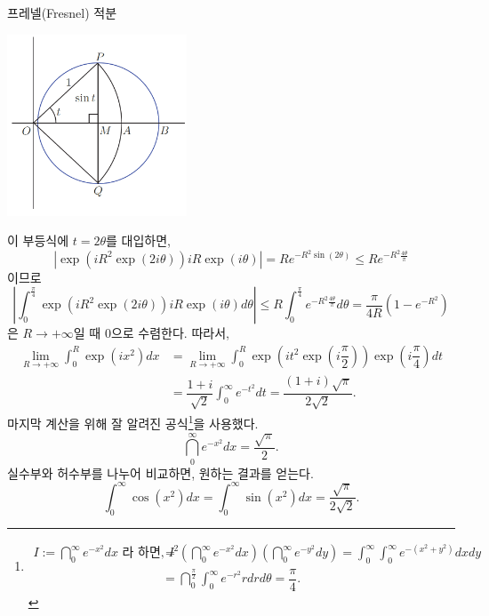 \begin{saltexample}[label=example-4-20]{프레넬(Fresnel) 적분}{}
\begin{center}
\includegraphics[width=0.4\textwidth]{./SaltChapter/figs/fig-4-5}
\end{center}
\label{fig-4-5}
\saltfigskip
이 부등식에 $t=2\theta$를 대입하면,
\[
\left| \exp(iR^2\exp(2i\theta))iR\exp(i\theta) \right|
= Re^{-R^2\sin(2\theta)} \le Re^{-R^2\frac{4\theta}\pi}
\]
이므로
\[
\left| \int_0^{\frac\pi4} \exp(iR^2\exp(2i\theta))iR\exp(i\theta) d\theta\right|
\le R \int_0^{\frac\pi4} e^{-R^2\frac{4\theta}\pi}d\theta
= \dfrac\pi{4R}(1-e^{-R^2})
\]
은 $R\to +\infty$일 때 $0$으로 수렴한다.
따라서, 
\begin{align*}
\lim_{R\to+\infty} \int_0^R \exp(ix^2)dx 
&=  \lim_{R\to+\infty}\int_0^R  \exp\left( it^2\exp\left( i\dfrac\pi2 \right)\right)
\exp\left(i\dfrac\pi4\right) dt \\
&= \dfrac{1+i}{\sqrt{2}} \int_0^\infty e^{-t^2}dt 
= \dfrac{(1+i)\sqrt{\pi}}{2\sqrt{2}}.
\end{align*}
마지막 계산을 위해 잘 알려진 공식\footnote{
\begin{align*}
I:=\dint_0^\infty e^{-x^2} dx\text{  라 하면, \ } 
I^2 &= \left(\dint_0^\infty e^{-x^2} dx\right)\left(\dint_0^\infty e^{-y^2} dy\right) 
= \int_0^\infty \int_0^\infty e^{-(x^2+y^2)}dxdy \\
&= \dint_0^{\frac\pi2} \int_0^\infty e^{-r^2}rdrd\theta = \dfrac\pi4.
\end{align*}
}을 사용했다.
\[
\dint_0^\infty e^{-x^2} dx = \dfrac{\sqrt{\pi}}2.
\]
실수부와 허수부를 나누어 비교하면, 원하는 결과를 얻는다.
\[
\int_0^\infty \cos(x^2) dx =  \int_0^\infty \sin(x^2) dx 
= \dfrac{\sqrt{\pi}}{2\sqrt{2}}.
\]
\end{saltexample}

